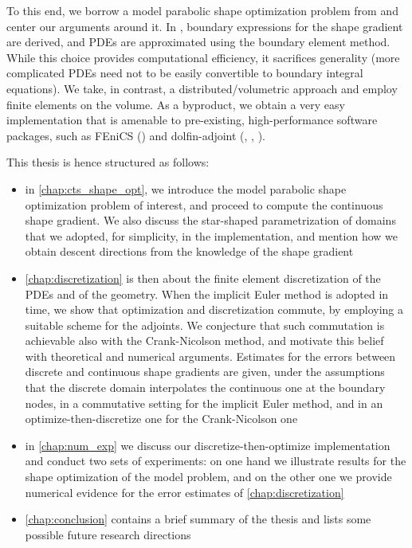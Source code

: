 \documentclass[english,a4paper,10pt,oneside]{scrbook}	%
\theoremstyle{break}
\theoremstyle{remark}
\begin{document}
To this end, we borrow a model parabolic shape optimization problem from \cite{harbrecht} and center our arguments around it. In \cite{harbrecht}, boundary expressions for the shape gradient are derived, and PDEs are approximated using the boundary element method. While this choice provides computational efficiency, it sacrifices generality (more complicated PDEs need not to be easily convertible to boundary integral equations). We take, in contrast, a distributed/volumetric approach and employ finite elements on the volume. As a byproduct, we obtain a very easy implementation that is amenable to pre-existing, high-performance software packages, such as FEniCS (\cite{fenics}) and dolfin-adjoint (\cite{dolfin-adjoint_1}, \cite{dolfin-adjoint_2}, \cite{dolfin-adjoint_3}). 

This thesis is hence structured as follows:

\begin{itemize}
	\item in \cref{chap:cts_shape_opt}, we introduce the model parabolic shape optimization problem of interest, and proceed to compute the continuous shape gradient. We also discuss the star-shaped parametrization of domains that we adopted, for simplicity, in the implementation, and mention how we obtain descent directions from the knowledge of the shape gradient
	\item \cref{chap:discretization} is then about the finite element discretization of the PDEs and of the geometry. When the implicit Euler method is adopted in time, we show that optimization and discretization commute, by employing a suitable scheme for the adjoints. We conjecture that such commutation is achievable also with the Crank-Nicolson method, and motivate this belief with theoretical and numerical arguments. Estimates for the errors between discrete and continuous shape gradients are given, under the assumptions that the discrete domain interpolates the continuous one at the boundary nodes, in a commutative setting for the implicit Euler method, and in an optimize-then-discretize one for the Crank-Nicolson one 
	\item in \cref{chap:num_exp} we discuss our discretize-then-optimize implementation and conduct two sets of experiments: on one hand we illustrate results for the shape optimization of the model problem, and on the other one we provide numerical evidence for the error estimates of \cref{chap:discretization}
	\item \cref{chap:conclusion} contains a brief summary of the thesis and lists some possible future research directions
\end{itemize}
\end{document}
